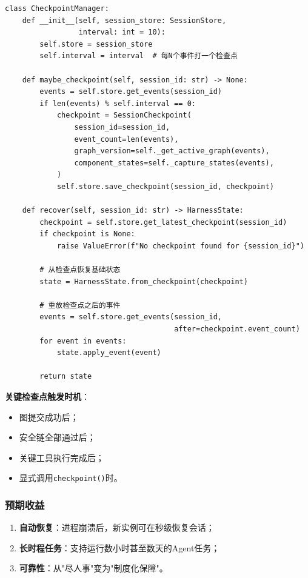 \documentclass[12pt,a4paper]{ctexart}
\begin{document}
\begin{lstlisting}[caption={自动检查点管理器}]
class CheckpointManager:
    def __init__(self, session_store: SessionStore,
                 interval: int = 10):
        self.store = session_store
        self.interval = interval  # 每N个事件打一个检查点

    def maybe_checkpoint(self, session_id: str) -> None:
        events = self.store.get_events(session_id)
        if len(events) % self.interval == 0:
            checkpoint = SessionCheckpoint(
                session_id=session_id,
                event_count=len(events),
                graph_version=self._get_active_graph(events),
                component_states=self._capture_states(events),
            )
            self.store.save_checkpoint(session_id, checkpoint)

    def recover(self, session_id: str) -> HarnessState:
        checkpoint = self.store.get_latest_checkpoint(session_id)
        if checkpoint is None:
            raise ValueError(f"No checkpoint found for {session_id}")

        # 从检查点恢复基础状态
        state = HarnessState.from_checkpoint(checkpoint)

        # 重放检查点之后的事件
        events = self.store.get_events(session_id,
                                       after=checkpoint.event_count)
        for event in events:
            state.apply_event(event)

        return state
\end{lstlisting}

\textbf{关键检查点触发时机}：
\begin{itemize}
    \item 图提交成功后；
    \item 安全链全部通过后；
    \item 关键工具执行完成后；
    \item 显式调用\texttt{checkpoint()}时。
\end{itemize}

\subsubsection{预期收益}

\begin{enumerate}
    \item \textbf{自动恢复}：进程崩溃后，新实例可在秒级恢复会话；
    \item \textbf{长时程任务}：支持运行数小时甚至数天的Agent任务；
    \item \textbf{可靠性}：从"尽人事"变为"制度化保障"。
\end{enumerate}
\end{document}
